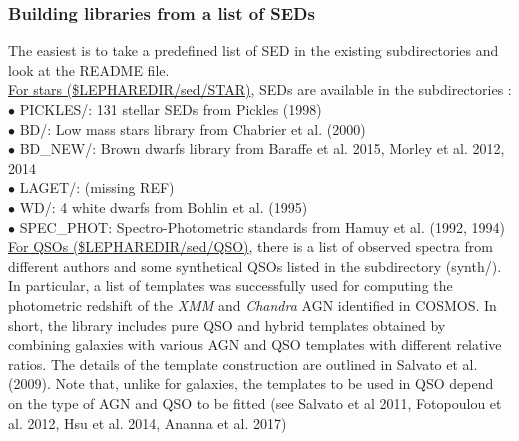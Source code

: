 \documentclass[12pt]{article}
\begin{document}
\subsubsection{Building libraries  from a list of SEDs }  

The easiest is to take a  predefined list of SED  in the existing subdirectories and look at the README file.  \\
 
 \noindent \underline{For stars  (\$LEPHAREDIR/sed/STAR)}, SEDs are available in the subdirectories : \\
  $\bullet$  PICKLES/:   131 stellar SEDs from Pickles (1998)    \\
  $\bullet$  BD/:  Low mass stars library from Chabrier et al. (2000)  \\
  $\bullet$  BD\_NEW/:  Brown dwarfs library from Baraffe et al. 2015, Morley et al. 2012, 2014  \\
   $\bullet$ LAGET/: (missing REF)\\
  $\bullet$  WD/:  4 white dwarfs from Bohlin et al. (1995) \\
  $\bullet$  SPEC\_PHOT: Spectro-Photometric standards from Hamuy et al. (1992, 1994)\\
 
 
  \noindent \underline{For QSOs  (\$LEPHAREDIR/sed/QSO)},  there is a 
   list of observed spectra from different authors and some synthetical QSOs listed in the subdirectory (synth/). In particular, a list of templates was successfully used for computing the photometric redshift of the {\it XMM} and {\it Chandra} AGN identified in COSMOS.  In short, the library includes pure QSO and hybrid templates obtained by combining galaxies with various AGN and QSO templates with different relative ratios. The details of the template construction are outlined in Salvato et al. (2009). Note that, unlike for galaxies, the templates to be used in QSO depend on the type of AGN and QSO to be fitted (see Salvato et al 2011, Fotopoulou et al. 2012, Hsu et al. 2014, Ananna et al. 2017)\\
    
\end{document}

